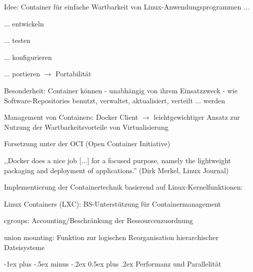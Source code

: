 \documentclass[a4paper]{article}
\makeatletter
\renewcommand{\section}{\@startsection{section}{1}{0mm}%
 {-1ex plus -.5ex minus -.2ex}%
 {0.5ex plus .2ex}%
 {\normalfont\large\bfseries}}
\makeatother
\begin{document}
\begin{multicols}{3}
    \begin{itemize*}
        \item
        Idee: Container für einfache Wartbarkeit von
        Linux-Anwendungsprogrammen ...
        \begin{itemize*}
            \item ... entwickeln
            \item ... testen
            \item ... konfigurieren
            \item ... portieren $\rightarrow$  Portabilität
        \end{itemize*}
        \item
        Besonderheit: Container können - unabhängig von ihrem Einsatzzweck -
        wie Software-Repositories benutzt, verwaltet, aktualisiert, verteilt
        ... werden
        \item
        Management von Containers: Docker Client $\rightarrow$
        leichtgewichtiger Ansatz zur Nutzung der Wartbarkeitsvorteile von
        Virtualisierung
        \item
        Forsetzung unter der OCI (Open Container Initiative)
        \begin{itemize*}
            \item ,,Docker does a nice job {[}...{]} for a focused purpose, namely the lightweight packaging and deployment of applications.'' (Dirk Merkel, Linux Journal)
        \end{itemize*}
        \item
        Implementierung der Containertechnik basierend auf
        Linux-Kernelfunktionen:
        \begin{itemize*}
            \item Linux Containers (LXC): BS-Unterstützung für Containermanagement
            \item cgroups: Accounting/Beschränkung der Ressourcenzuordnung
            \item union mounting: Funktion zur logischen Reorganisation hierarchischer Dateisysteme
        \end{itemize*}
        \item
    \end{itemize*}


    \section{Performanz und
      Parallelität}



\end{multicols}
\end{document}
